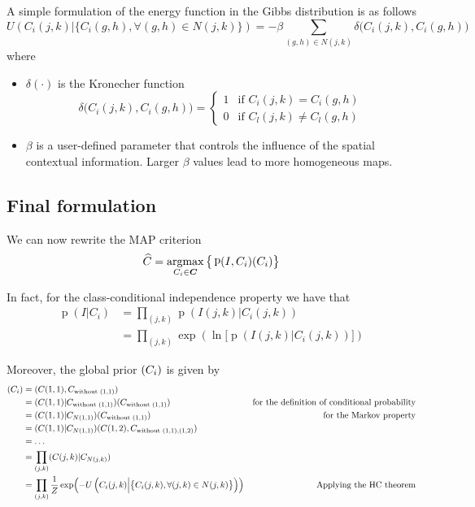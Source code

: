 \documentclass[oneside,onecolumn]{report}
\DeclareMathOperator*{\argmax}{argmax}
\DeclareMathOperator*{\pdf}{p}
\let\P\relax
\DeclareMathOperator*{\P}{P}
\begin{document}
A simple formulation of the energy function in the Gibbs distribution is as follows
$$ U \left( C_i(j, k) \Big| \big\{ C_i(g, h), \forall (g, h) \in N(j, k) \big\} \right) = -\beta \sum_{(g,h) \in N(j, k)} \delta \big(C_i(j, k), C_i(g, h) \big) $$
where
\begin{itemize}
    \item $\delta(\cdot)$ is the Kronecher function
    $$ \delta \big(C_i(j, k), C_i(g, h) \big) = \begin{cases}
        1 & \text{if } C_i(j, k) = C_i(g, h) \\
        0 & \text{if } C_l(j, k) \neq C_l(g, h)
    \end{cases} $$
    \item $\beta$ is a user-defined parameter that controls the influence of the spatial contextual information. Larger $\beta$ values lead to more homogeneous maps.
\end{itemize}

\subsection{Final formulation}
We can now rewrite the MAP criterion
$$ \widehat C = \argmax_{C_i \in \bm C} \big\{ \pdf(I, C_i) \P(C_i)  \big\} $$

In fact, for the class-conditional independence property we have that
\begin{align*}
    \pdf(I | C_i)
    &= \prod_{(j, k)} \pdf(I(j, k) | C_i(j, k)) \\
    &= \prod_{(j, k)} \exp(\ln \big[ \pdf(I(j, k) | C_i(j, k)) \big] )
\end{align*}

Moreover, the global prior $\P(C_i)$ is given by
\begin{align*}
    \P(C_i)
    &= \P(C(1, 1), C_{\text{without } (1, 1)}) \\
    &= \P(C(1, 1) | C_{\text{without } (1, 1)}) \P(C_{\text{without } (1, 1)}) & \text{for the definition of conditional probability} \\
    &= \P(C(1, 1) | C_{N(1, 1)}) \P(C_{\text{without } (1, 1)}) & \text{for the Markov property} \\
    &= \P(C(1, 1) | C_{N(1, 1)}) \P(C(1, 2), C_{\text{without } (1, 1), (1, 2)}) \\
    &= \dots \\
    &= \prod_{(j, k)} \P(C(j, k) | C_{N(j, k)}) \\
    &= \prod_{(j, k)} \frac{1}{Z} \exp(-U \left( C_i(j, k) \Big| \big\{ C_i(j, k), \forall (j, k) \in N(j, k) \big\} \right)) & \text{Applying the HC theorem}
\end{align*}
\end{document}
